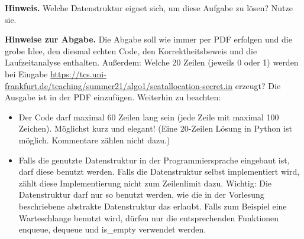 \documentclass{uebung_cs}
\begin{document}
\textbf{Hinweis.}
Welche Datenstruktur eignet sich, um diese Aufgabe zu lösen? Nutze sie.

\textbf{Hinweise zur Abgabe.}
Die Abgabe soll wie immer per PDF erfolgen und die grobe Idee, den diesmal echten Code, den Korrektheitsbeweis und die Laufzeitanalyse enthalten.
Außerdem: Welche 20 Zeilen (jeweils 0 oder 1) werden bei Eingabe \url{https://tcs.uni-frankfurt.de/teaching/summer21/algo1/seatallocation-secret.in} erzeugt? Die Ausgabe ist in der PDF einzufügen.
Weiterhin zu beachten:
\begin{itemize}
\item Der Code darf maximal 60 Zeilen lang sein (jede Zeile mit maximal 100 Zeichen). Möglichst kurz und elegant! (Eine 20-Zeilen Lösung in Python ist möglich. Kommentare zählen nicht dazu.)
\item Falls die genutzte Datenstruktur in der Programmiersprache eingebaut ist, darf diese benutzt werden. Falls die Datenstruktur selbst implementiert wird, zählt diese Implementierung nicht zum Zeilenlimit dazu. Wichtig: Die Datenstruktur darf nur so benutzt werden, wie die in der Vorlesung beschriebene abstrakte Datenstruktur das erlaubt. Falls zum Beispiel eine Warteschlange benutzt wird, dürfen nur die entsprechenden Funktionen enqueue, dequeue und is\_empty verwendet werden.
\end{itemize}
\end{document}
